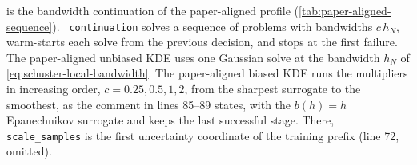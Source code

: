 
 is the bandwidth continuation of the paper-aligned
profile (\cref{tab:paper-aligned-sequence}). \texttt{\_continuation} solves a
sequence of problems with bandwidths $c\,h_N$, warm-starts each solve from the
previous decision, and stops at the first failure. The paper-aligned unbiased
KDE uses one Gaussian solve at the bandwidth $h_N$ of
\cref{eq:schuster-local-bandwidth}. The paper-aligned biased KDE runs the
multipliers in increasing order, $c=0.25,0.5,1,2$, from the sharpest surrogate
to the smoothest, as the comment in lines 85--89 states, with the $b(h)=h$
Epanechnikov surrogate and keeps the last successful stage. There,
\texttt{scale\_samples} is the first uncertainty coordinate of the training
prefix (line 72, omitted).


